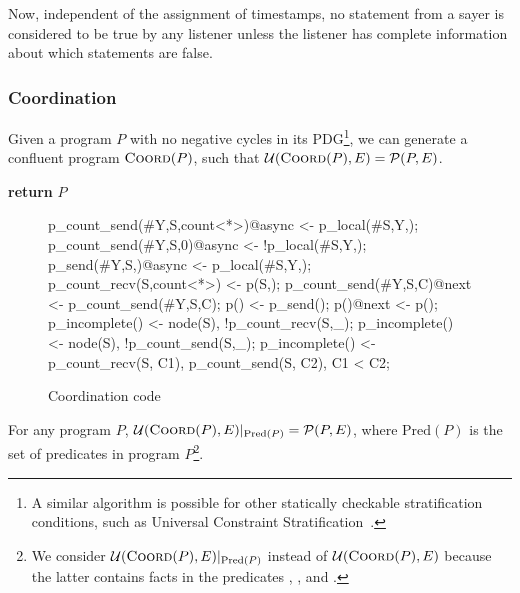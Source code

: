Now, independent of the assignment of timestamps, no statement from a sayer  is considered to be true by any listener unless the listener has complete information about which statements are false.

\subsubsection{Coordination}
\label{sec:coord}
Given a \lang program $P$ with no negative cycles in its PDG\footnote{A similar algorithm is possible for other statically checkable stratification conditions, such as Universal Constraint Stratification~\cite{ucs}.}, we can generate a confluent program $\textsc{Coord}(P)$, such that \linebreak $\mathcal{U}(\textsc{Coord}(P), E) = \mathcal{P}(P, E)$.

\begin{algorithmic}[1]
  \EndFor
   \label{alg:addrules} %
   \label{alg:lastfor}
  \EndFor
  \EndFor%
  \State \textbf{return} $P$
  \EndProcedure
\end{algorithmic}


\begin{figure}[h!]
\label{fig:coordcode}
\begin{Dedalus}
p_count_send(#Y,S,count<*>)@async <- p_local(#S,Y,);
p_count_send(#Y,S,0)@async <- !p_local(#S,Y,\dbar{_});
p_send(#Y,S,)@async <- p_local(#S,Y,);
p_count_recv(S,count<*>) <- p(S,);
p_count_send(#Y,S,C)@next <- p_count_send(#Y,S,C);
p() <- p_send();
p()@next <- p();
p_incomplete() <- node(S), !p_count_recv(S,_);
p_incomplete() <- node(S), !p_count_send(S,_);
p_incomplete() <- p_count_recv(S, C1),
                  p_count_send(S, C2), C1 < C2;
\end{Dedalus}
\caption{Coordination code}
\end{figure}

\begin{theorem}
For any program $P$, $\mathcal{U}(\textsc{Coord}(P), E)|_{\text{Pred}(P)} = \mathcal{P}(P, E)$, where $\text{Pred}(P)$ is the set of predicates in program $P$\footnote{We consider $\mathcal{U}(\textsc{Coord}(P), E)|_{\text{Pred}(P)}$ instead of $\mathcal{U}(\textsc{Coord}(P), E)$ because the latter contains facts in the predicates , , and .}.
\end{theorem}


